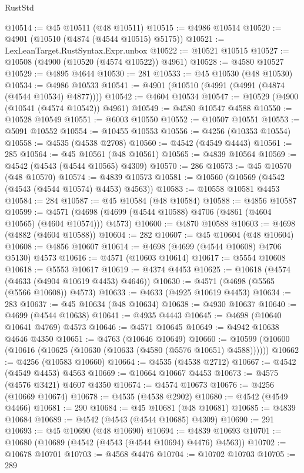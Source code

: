 \begin{lexlean}{RustStd}
\begin{coremodule}
@10514 := @45 @10511 (@48 @10511)
@10515 := @4986 @10514
@10520 := @4901 (@10510 (@4874 (@4544 @10515) @5175))
@10521 := LexLeanTarget.RustSyntax.Expr.unbox
@10522 := @10521 @10515
@10527 := @10508 (@4900 (@10520 (@4574 @10522)) @4961)
@10528 := @4580 @10527
@10529 := @4895 @4644
@10530 := 281
@10533 := @45 @10530 (@48 @10530)
@10534 := @4986 @10533
@10541 := @4901 (@10510 (@4991 (@4991 (@4874 (@4544 @10534) @4877))))
@10542 := @4604 @10534
@10547 := @10529 (@4900 (@10541 (@4574 @10542)) @4961)
@10549 := @4580 @10547 @4588
@10550 := @10528 @10549
@10551 := @6003 @10550
@10552 := @10507 @10551
@10553 := @5091 @10552
@10554 := @10455 @10553
@10556 := @4256 (@10353 @10554)
@10558 := @4535 (@4538 @2708)
@10560 := @4542 (@4549 @4443)
@10561 := 285
@10564 := @45 @10561 (@48 @10561)
@10565 := @4839 @10564
@10569 := @4542 (@4543 (@4544 @10565) @4309)
@10570 := 286
@10573 := @45 @10570 (@48 @10570)
@10574 := @4839 @10573
@10581 := @10560 (@10569 (@4542 (@4543 (@4544 @10574) @4453) @4563))
@10583 := @10558 @10581 @4453
@10584 := 284
@10587 := @45 @10584 (@48 @10584)
@10588 := @4856 @10587
@10599 := @4571 (@4698 (@4699 (@4544 @10588) @4706 (@4861 (@4604 @10565) (@4604 @10574))) @4573)
@10600 := @4870 @10588
@10603 := @4698 (@4882 (@4604 @10588))
@10604 := 282
@10607 := @45 @10604 (@48 @10604)
@10608 := @4856 @10607
@10614 := @4698 (@4699 (@4544 @10608) @4706 @5130) @4573
@10616 := @4571 (@10603 @10614)
@10617 := @5554 @10608
@10618 := @5553 @10617
@10619 := @4374 @4453
@10625 := @10618 (@4574 (@4633 (@4904 @10619 @4453) @4646))
@10630 := @4571 (@4698 (@5565 (@5566 @10608)) @4573)
@10633 := @4633 (@4925 @10619 @4453)
@10634 := 283
@10637 := @45 @10634 (@48 @10634)
@10638 := @4930 @10637
@10640 := @4699 (@4544 @10638)
@10641 := @4935 @4443
@10645 := @4698 (@10640 @10641 @4769) @4573
@10646 := @4571 @10645
@10649 := @4942 @10638 @4646 @4350
@10651 := @4763 (@10646 @10649)
@10660 := @10599 (@10600 (@10616 (@10625 (@10630 (@10633 (@4580 (@5576 @10651) @4588))))))
@10662 := @4256 (@10583 @10660)
@10664 := @4535 (@4538 @2712)
@10667 := @4542 (@4549 @4453) @4563
@10669 := @10664 @10667 @4453
@10673 := @4575 (@4576 @3421) @4607 @4350
@10674 := @4574 @10673
@10676 := @4256 (@10669 @10674)
@10678 := @4535 (@4538 @2902)
@10680 := @4542 (@4549 @4466)
@10681 := 290
@10684 := @45 @10681 (@48 @10681)
@10685 := @4839 @10684
@10689 := @4542 (@4543 (@4544 @10685) @4309)
@10690 := 291
@10693 := @45 @10690 (@48 @10690)
@10694 := @4839 @10693
@10701 := @10680 (@10689 (@4542 (@4543 (@4544 @10694) @4476) @4563))
@10702 := @10678 @10701
@10703 := @4568 @4476
@10704 := @10702 @10703
@10705 := 289

\end{coremodule}
\end{lexlean}
